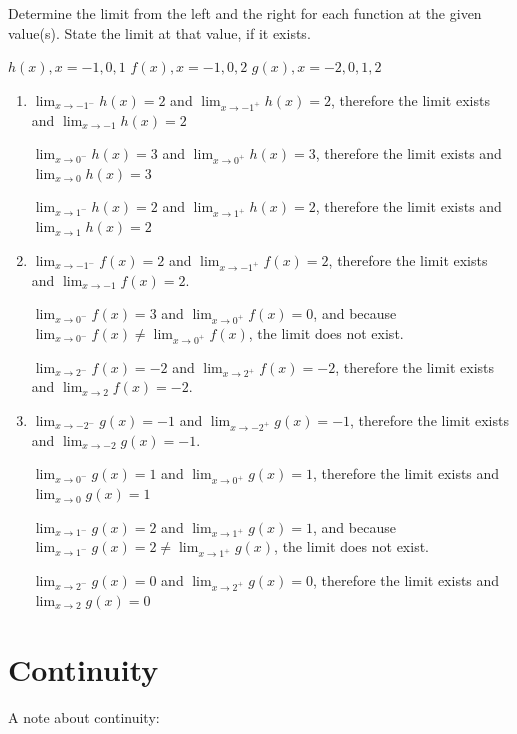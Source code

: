 \begin{Exercise}[title = Limits Practice 4, label=limits4]
Determine the limit from the left and the right for each function at the given 
value(s). State the limit at that value, if it exists.

\Question $h(x), x=-1, 0, 1$
\Question $f(x), x=-1, 0, 2$
\Question $g(x), x=-2, 0, 1, 2$
\vspace{60mm}
\end{Exercise}
\begin{Answer}[ref=limits4]
    \begin{enumerate}
    \item $\lim_{x\to -1^-}h(x) = 2$ and $\lim_{x\to -1^+}h(x)=2$, therefore the limit exists and $\lim_{x\to-1}h(x)=2$

    $\lim_{x\to 0^-}h(x) = 3$ and $\lim_{x\to 0^+}h(x)=3$, therefore the limit exists and $\lim_{x\to0}h(x)=3$

    $\lim_{x\to 1^-}h(x) = 2$ and $\lim_{x\to 1^+}h(x)=2$, therefore the limit exists and $\lim_{x\to1}h(x)=2$
    \item $\lim_{x\to -1^-}f(x)=2$ and $\lim_{x\to -1^+}f(x)=2$, therefore the limit exists and $\lim_{x\to-1}f(x) = 2$.

    $\lim_{x\to 0^-}f(x) = 3$ and $\lim_{x\to 0^+}f(x) = 0$, and because $\lim_{x\to 0^-}f(x) \neq \lim_{x\to 0^+}f(x)$, the limit does not exist.

    $\lim_{x\to 2^-}f(x) = -2$ and $\lim_{x\to 2^+}f(x) = -2$, therefore the limit exists and $\lim_{x\to2}f(x) = -2$.

    \item $\lim_{x\to -2^-}g(x) = -1$ and $\lim_{x\to -2^+}g(x) = -1$, therefore the limit exists and $\lim_{x\to-2}g(x) = -1$.

    $\lim_{x\to 0^-}g(x)=1$ and $\lim_{x\to 0^+}g(x) = 1$, therefore the limit exists and $\lim_{x\to0}g(x) = 1$

    $\lim_{x\to 1^-}g(x) = 2$ and $\lim_{x\to 1^+}g(x) = 1$, and because $\lim_{x\to 1^-}g(x) = 2 \neq \lim_{x\to 1^+}g(x)$, the limit does not exist.

    $\lim_{x\to 2^-}g(x) = 0$ and $\lim_{x\to 2^+}g(x) = 0$, therefore the limit exists and $\lim_{x\to2}g(x) = 0$
\end{enumerate}
\end{Answer}

\section{Continuity}
A note about continuity:

